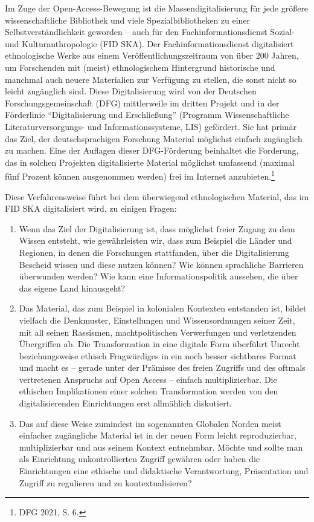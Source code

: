 \documentclass[a4paper,
fontsize=11pt,
oneside,
numbers=noperiodatend,
parskip=half-,
bibliography=totoc,
final
]{scrartcl}
\begin{document}
Im Zuge der Open-Access-Bewegung ist die Massendigitalisierung für jede
größere wissenschaftliche Bibliothek und viele Spezialbibliotheken zu
einer Selbstverständlichkeit geworden -- auch für den
Fachinformationsdienst Sozial- und Kulturanthropologie (FID SKA). Der
Fachinformationsdienst digitalisiert ethnologische Werke aus einem
Veröffentlichungszeitraum von über 200 Jahren, um Forschenden mit
(meist) ethnologischem Hintergrund historische und manchmal auch neuere
Materialien zur Verfügung zu stellen, die sonst nicht so leicht
zugänglich sind. Diese Digitalisierung wird von der Deutschen
Forschungsgemeinschaft (DFG) mittlerweile im dritten Projekt und in der
Förderlinie \enquote{Digitalisierung und Erschließung} (Programm
Wissenschaftliche Literaturversorgungs- und Informationssysteme, LIS)
gefördert. Sie hat primär das Ziel, der deutschsprachigen Forschung
Material möglichst einfach zugänglich zu machen. Eine der Auflagen
dieser DFG-Förderung beinhaltet die Forderung, das in solchen Projekten
digitalisierte Material möglichst umfassend (maximal fünf Prozent können
ausgenommen werden) frei im Internet anzubieten.\footnote{DFG 2021, S.
  6.}

Diese Verfahrensweise führt bei dem überwiegend ethnologischen Material,
das im FID SKA digitalisiert wird, zu einigen Fragen:

\begin{enumerate}
\def\labelenumi{\arabic{enumi}.}
\item
  Wenn das Ziel der Digitalisierung ist, dass möglichst freier Zugang zu
  dem Wissen entsteht, wie gewährleisten wir, dass zum Beispiel die
  Länder und Regionen, in denen die Forschungen stattfanden, über die
  Digitalisierung Bescheid wissen und diese nutzen können? Wie können
  sprachliche Barrieren überwunden werden? Wie kann eine
  Informationspolitik aussehen, die über das eigene Land hinausgeht?
\item
  Das Material, das zum Beispiel in kolonialen Kontexten entstanden ist,
  bildet vielfach die Denkmuster, Einstellungen und Wissensordnungen
  seiner Zeit, mit all seinen Rassismen, machtpolitischen Verwerfungen
  und verletzenden Übergriffen ab. Die Transformation in eine digitale
  Form überführt Unrecht beziehungsweise ethisch Fragwürdiges in ein
  noch besser sichtbares Format und macht es -- gerade unter der
  Prämisse des freien Zugriffs und des oftmals vertretenen Anspruchs auf
  Open Access -- einfach multiplizierbar. Die ethischen Implikationen
  einer solchen Transformation werden von den digitalisierenden
  Einrichtungen erst allmählich diskutiert.
\item
  Das auf diese Weise zumindest im sogenannten Globalen Norden meist
  einfacher zugängliche Material ist in der neuen Form leicht
  reproduzierbar, multiplizierbar und aus seinem Kontext entnehmbar.
  Möchte und sollte man als Einrichtung unkontrollierten Zugriff
  gewähren oder haben die Einrichtungen eine ethische und didaktische
  Verantwortung, Präsentation und Zugriff zu regulieren und zu
  kontextualisieren?
\end{enumerate}
\end{document}
